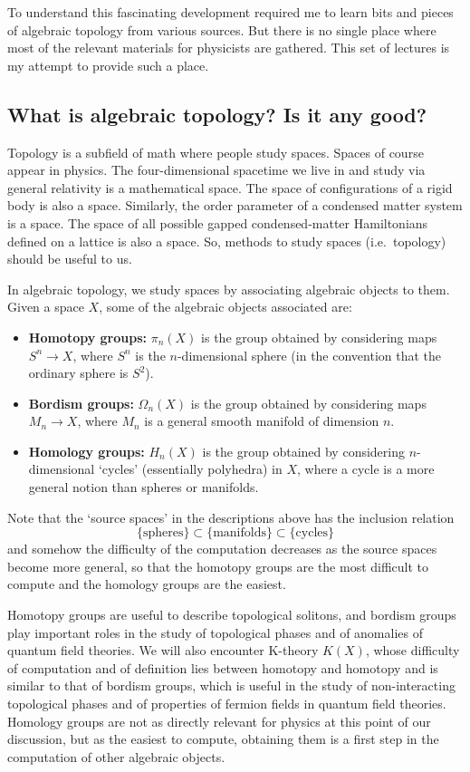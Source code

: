\documentclass[12pt]{article}
\numberwithin{equation}{section}
\begin{document}
To understand this fascinating development required me to learn bits and pieces of algebraic topology 
from various sources. But there is no single place where most of the relevant materials for physicists
are gathered. 
This set of lectures is my attempt to provide such a place.

\subsection{What is algebraic topology? Is it any good?}

Topology is a subfield of math where people study spaces.
Spaces of course appear in physics. 
The four-dimensional spacetime we live in and study via general relativity is a mathematical space.
The space of configurations of a rigid body is also a space.
Similarly, the order parameter of a condensed matter system is a space.
The space of all possible gapped condensed-matter Hamiltonians defined on a lattice 
is also a space.
So, methods to study spaces (i.e.~topology) should be useful to us.

In algebraic topology, we study spaces by associating algebraic objects to them.
Given a space $X$, some of the algebraic objects associated are:
\begin{itemize}
\item \textbf{Homotopy groups:} $\pi_n(X)$ is the group obtained by considering maps $S^n \to X$,
where $S^n$ is the $n$-dimensional sphere (in the convention that the ordinary sphere is $S^2$).
\item \textbf{Bordism groups:} $\Omega_n(X)$ is the group obtained by considering maps $M_n \to X$,
where $M_n$ is a general smooth manifold of dimension $n$.
\item \textbf{Homology groups:} $H_n(X)$ is the group obtained by considering $n$-dimensional `cycles' (essentially polyhedra)
 in $X$, where a cycle is a more general notion than spheres or manifolds.
\end{itemize}
Note that the `source spaces' in the descriptions above has the inclusion relation \begin{equation}
  \{\text{spheres}\} \subset \{\text{manifolds}\} \subset \{\text{cycles}\}
\end{equation} and somehow the difficulty of the computation decreases as the source spaces become more general,
so that the homotopy groups are the most difficult to compute and the homology groups are the easiest.

Homotopy groups are useful to describe topological solitons,
and bordism groups play important roles in the study of topological phases
and of anomalies of quantum field theories.
We will also encounter K-theory $K(X)$, whose difficulty of computation and of definition lies between homotopy and homotopy 
and is similar to that of bordism groups, 
which is useful in the study of non-interacting topological phases
and of properties of fermion fields in quantum field theories.
Homology groups are not as directly relevant for physics at this point of our discussion,
but as the easiest to compute, obtaining them is a first step in the computation of other algebraic objects.
\end{document}
